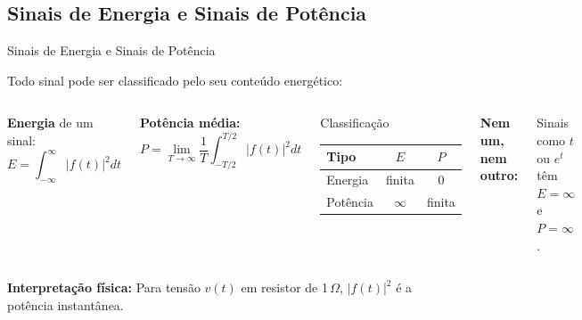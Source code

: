 
\subsection{Sinais de Energia e Sinais de Potência}

\begin{frame}{Sinais de Energia e Sinais de Potência}

Todo sinal pode ser classificado pelo seu conteúdo energético:

\begin{columns}[T]
\textbf{Energia} de um sinal:
\[
E = \int_{-\infty}^{\infty} |f(t)|^2 dt
\]

\textbf{Potência média:}
\[
P = \lim_{T \to \infty} \frac{1}{T} \int_{-T/2}^{T/2} |f(t)|^2 dt
\]

\begin{block}{Classificação}
\begin{tabular}{lcc}
\textbf{Tipo} & $E$ & $P$ \\ \hline
Energia & finita & $0$ \\
Potência & $\infty$ & finita
\end{tabular}
\end{block}

\vspace{0.2cm}

\textbf{Nem um, nem outro:}

Sinais como $t$ ou $e^t$ têm $E = \infty$ e $P = \infty$.
\end{columns}

\vspace{0.2cm}

\textbf{Interpretação física:} Para tensão $v(t)$ em resistor de 1\,$\Omega$, $|f(t)|^2$ é a potência instantânea.

\end{frame}


